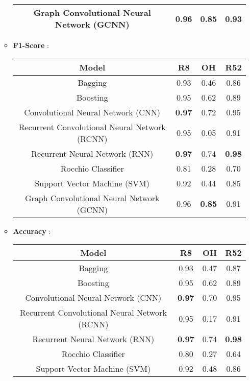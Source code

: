 \begin{itemize}
\begin{itemize}
\begin{tabular}{|c|c|c|c|}
                Graph Convolutional Neural Network (GCNN) & 0.96 & \textbf{0.85} & 0.93\\\hline
            \end{tabular}
        \item \textbf{F1-Score} :
            \newline
            \begin{tabular}{|c|c|c|c|}\hline
                 \textbf{Model} & \textbf{R8} & \textbf{OH} & \textbf{R52} \\\hline
                Bagging & 0.93 & 0.46 & 0.86 \\\hline
                Boosting & 0.95 & 0.62 & 0.89 \\\hline
                Convolutional Neural Network (CNN) & \textbf{0.97} & 0.72 & 0.95 \\\hline
                Recurrent Convolutional Neural Network (RCNN) & 0.95 & 0.05 &  0.91\\\hline
                Recurrent Neural Network (RNN) & \textbf{0.97} & 0.74  &  \textbf{0.98}\\\hline
                Rocchio Classifier & 0.81 & 0.28 &  0.70\\\hline
                Support Vector Machine (SVM) & 0.92 & 0.44 & 0.85 \\\hline
                Graph Convolutional Neural Network (GCNN) & 0.96 & \textbf{0.85} & 0.91\\\hline
            \end{tabular}
        \item \textbf{Accuracy} :
            \newline
            \begin{tabular}{|c|c|c|c|}\hline
                 \textbf{Model} & \textbf{R8} & \textbf{OH} & \textbf{R52} \\\hline
                Bagging & 0.93 & 0.47 &  0.87\\\hline
                Boosting & 0.95 & 0.62 & 0.89 \\\hline
                Convolutional Neural Network (CNN) & \textbf{0.97} & 0.70 &  0.95\\\hline
                Recurrent Convolutional Neural Network (RCNN) & 0.95 & 0.17 & 0.91 \\\hline
                Recurrent Neural Network (RNN) & \textbf{0.97} & 0.74 &  \textbf{0.98}\\\hline
                Rocchio Classifier & 0.80 & 0.27 &  0.64\\\hline
                Support Vector Machine (SVM) & 0.92 & 0.48 &  0.86\\\hline

\end{tabular}
\end{itemize}
\end{itemize}
